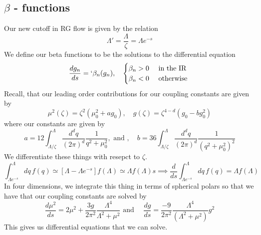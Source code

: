  \subsection{$ \beta$ - functions}
 Our new cutoff in RG flow is given by the relation 
\[
 \Lambda ' = \frac{ \Lambda }{ \zeta  } = \Lambda e^{ - s }
\] We define our beta functions to be the 
solutions to the differential equation 
\[
	\frac{ d g_ n }{ ds } = `\beta_ n ( g _ n ) , \quad \begin{cases}
		\beta_ n > 0 & \text{ in the IR } \\
		\beta _ n < 0 & \text{ otherwise }
	\end{cases}
\] Recall, that our leading order 
contributions for our coupling constants are given by 
\[
 \mu ^ 2 ( \zeta ) = \zeta ^ 2 ( \mu _ 0 ^ 2  + ag_0 ), \quad
 g ( \zeta ) = \zeta ^{ 4 - d  } ( g_0 - b g_0^ 2 ) 
\] where our constants are given by 
\[
	a = 12 \int_{ \Lambda / \zeta } ^ \Lambda \frac{  d^ d q }{ ( 2 \pi ) ^ d }
	\frac{1}{q ^ 2 + \mu _ 0 ^ 2}, \text{ and } , \quad
	b = 36 \int _{ \Lambda / \zeta } ^  \Lambda \frac{ d ^ d q }{ 
	( 2 \pi ) ^ d  } \frac{1}{( q ^ 2 + \mu _ 0 ^ 2 ) ^ 2 }
\] We differentiate these things with resepct to $ \zeta $. 
\[
	\int _{ \Lambda e ^{ - s} } ^ \Lambda dq \, f ( q) 
	\simeq \left[  \Lambda - \Lambda e^{ - s}  \right] f ( \Lambda ) 
	\simeq \Lambda f ( \Lambda ) s \implies 
	\frac{ d }{ ds } \int _{ \Lambda e ^{ - s} } ^ \Lambda 
	dq \, f ( q ) = \Lambda f ( \Lambda ) 
\] In four dimensions, we integrate this 
thing in terms of spherical polars so that 
we have that our coupling constants are solved by 
\[
 \frac{d \mu ^ 2 }{ ds } = 2 \mu ^ 2 + \frac{ 3g }{ 2 \pi ^ 2 } 
 \frac{ \Lambda ^ 4 }{ \Lambda ^ 2 + \mu ^ 2  } \text{ and } \quad
 \frac{ dg }{ ds } = \frac{ - 9 }{ 2 \pi ^ 2 } \frac{ \Lambda ^ 4 }{
 ( \Lambda ^ 2 + \mu ^ 2 ) } g ^ 2  
\] This gives us differential equations that 
we can solve. 

